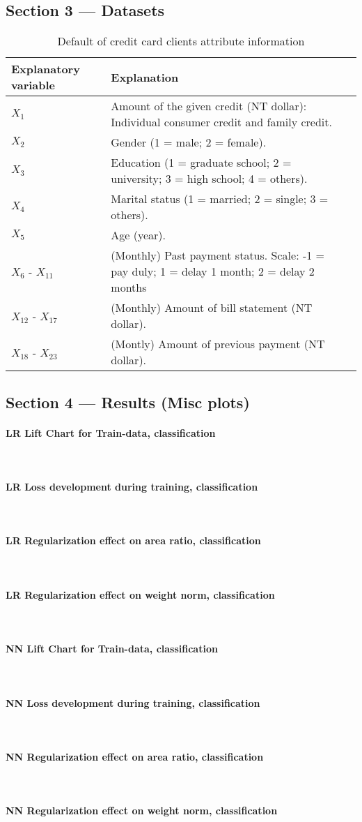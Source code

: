\documentclass[10pt, a4paper, twocolumn]{article}
\newcommand{\myparagraph}[1]{\paragraph{#1}\mbox{}\\}
\begin{document}
	\subsection{Section 3 --- Datasets}
	\begin{table} [H]
		\caption{Default of credit card clients attribute information}
			\begin{tabular}{@{}lll@{}} %
				\toprule
				Explanatory variable & Explanation \\ \midrule
				$X_1$ & Amount of the given credit (NT dollar): Individual consumer credit and family credit.\\
				$X_2$ & Gender (1 = male; 2 = female). \\
				$X_3$ & Education (1 = graduate school; 2 = university; 3 = high school; 4 = others).\\
				$X_4$ & Marital status (1 = married; 2 = single; 3 = others).\\
				$X_5$ & Age (year).\\				
				$X_6$ - $X_{11}$ & (Monthly) Past payment status. Scale: -1 = pay duly; 1 = delay 1 month; 2 = delay 2 months\\
				$X_{12}$ - $X_{17}$ & (Monthly) Amount of bill statement (NT dollar).\\
				$X_{18}$ - $X_{23}$ & (Montly) Amount of previous payment (NT dollar).\\ \bottomrule
		\end{tabular}%
	\end{table}	
\twocolumn
	\subsection{Section 4 --- Results (Misc plots)}
		\myparagraph{LR Lift Chart for Train-data, classification}
		\myparagraph{LR Loss development during training, classification}
		\myparagraph{LR Regularization effect on area ratio, classification}
		\myparagraph{LR Regularization effect on weight norm, classification}
		
		\myparagraph{NN Lift Chart for Train-data, classification}
		\myparagraph{NN Loss development during training, classification}
		\myparagraph{NN Regularization effect on area ratio, classification}
		\myparagraph{NN Regularization effect on weight norm, classification}
	
\nocite{*}


\end{document}
